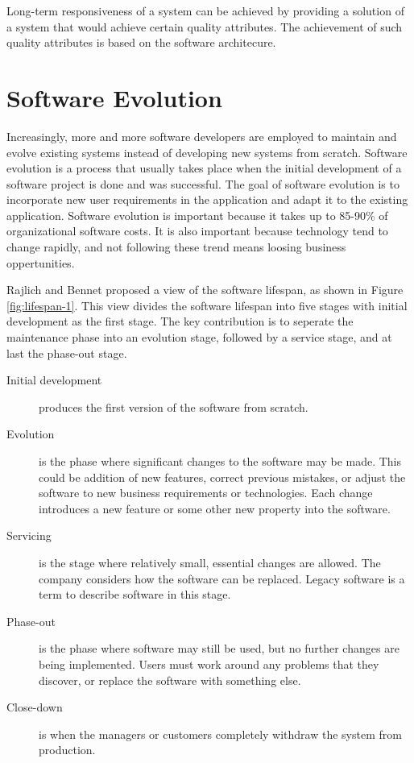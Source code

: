 Long-term responsiveness of a system can be achieved by providing a solution of a system that would achieve certain quality attributes. The achievement of such quality attributes is based on the software architecure. 




\section{Software Evolution}
Increasingly, more and more software developers are employed to maintain and evolve existing systems instead of developing new systems from scratch\cite{Sommerville:2011:SE}. Software evolution is a process that usually takes place when the initial development of a software project is done and was successful\cite{Bennett:2000:SME:336512.336534}. The goal of software evolution is to incorporate new user requirements in the application and adapt it to the existing application. Software evolution is important because it takes up to 85-90\% of organizational software costs\cite{Sommerville:2011:SE}. It is also important because technology tend to change rapidly, and not following these trend means loosing business oppertunities.

Rajlich and Bennet\cite{Bennett:2000:SME:336512.336534} proposed a view of the software lifespan, as shown in Figure \ref{fig:lifespan-1}. This view divides the software lifespan into five stages with initial development as the first stage. The key contribution is to seperate the maintenance phase into an evolution stage, followed by a service stage, and at last the phase-out stage.
\begin{description}
	\item[Initial development] produces the first version of the software from scratch.
	\item[Evolution] is the phase where significant changes to the software may be made. This could be addition of new features, correct previous mistakes, or adjust the software to new business requirements or technologies. Each change introduces a new feature or some other new property into the software.
	\item[Servicing] is the stage where relatively small, essential changes are allowed. The company considers how the software can be replaced. Legacy software is a term to describe software in this stage.
	\item[Phase-out] is the phase where software may still be used, but no further changes are being implemented. Users must work around any problems that they discover, or replace the software with something else.
	\item[Close-down] is when the managers or customers completely withdraw the system from production.
\end{description} 

